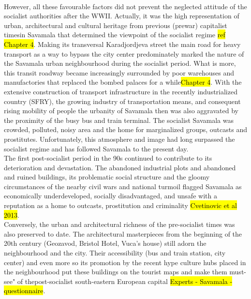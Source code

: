 \documentclass[11pt]{report}
\begin{document}
\\
However, all these favourable factors did not prevent the neglected attitude of the socialist authorities after the WWII. Actually, it was the high representation of urban, architectural and cultural heritage from previous (prewar) capitalist times\footnotemark in Savamala that determined the viewpoint of the socialist regime \hl{ref Chapter 4}.
Making its transversal Karadjordjeva street the main road for heavy transport as a way to bypass the city center predominately marked the nature of the Savamala urban neighbourhood during the socialist period.
What is more, this transit roadway became increasingly surrounded by poor warehouses and manufactories that replaced the bombed palaces for a while\hl{Chapter 4}. 
With the extensive construction of transport infrastructure in the recently industrialized country (SFRY), the growing  industry of transportation means, and consequent rising mobility of people the urbanity of Savamala then was also aggravated by the proximity of the busy bus and train terminal. \footnotemark The socialist Savamala was crowded, polluted, noisy area and the home for marginalized groups, outcasts and prostitutes.
Unfortunately, this atmosphere and image had long surpassed the socialist regime and has followed Savamala to the present day.
\\
The first post-socialist period in the 90s continued to contribute to its deterioration and devastation. The abandoned industrial plots and abandoned and ruined buildings, its problematic social structure and the gloomy circumstances of the nearby civil wars and national turmoil flagged Savamala as economically underdeveloped, socially disadvantaged, and unsafe with a reputation as a home to outcasts, prostitution and criminality \hl{Cvetinovic et al 2013}.
\\
Conversely, the urban and architectural richness of the pre-socialist times was also preserved to date.
The architectural masterpieces from the beginning of the 20th century (Geozavod, Bristol Hotel, Vuca's house) still adorn the neighbourhood and the city. Their accessibility (bus and train station, city center) and even more so its promotion by the recent hype culture hubs placed in the neighbourhood put these buildings on the tourist maps and make them must-see" of thepost-socialist south-eastern European capital \hl{Experts - Savamala - questionnaire}.
\end{document}
